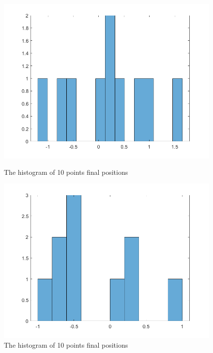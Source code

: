\documentclass{article}
\begin{document}
\begin{figure}[htbp]
    \centering
    \begin{minipage}{0.45\linewidth}
        \centering
        \includegraphics[width=0.8\linewidth]{walk10.png}
        \caption{The histogram of 10 points final positions}
    \end{minipage}
    \hfill
    \begin{minipage}{0.45\linewidth}
        \centering
        \includegraphics[width=0.8\linewidth]{walk101.png}
        \caption{The histogram of 10 points final positions}
    \end{minipage}
\end{figure}
\end{document}
